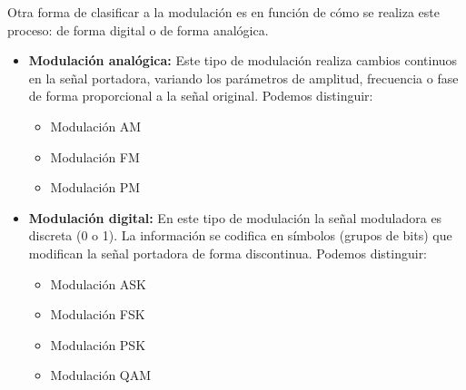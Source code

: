 \documentclass[12pt, letterpaper]{article}
\begin{document}
Otra forma de clasificar a la modulación es en función de cómo se realiza este proceso: de forma digital o de forma analógica. 

\begin{itemize}
    \item \textbf{Modulación analógica:} Este tipo de modulación realiza cambios continuos en la señal portadora, variando los parámetros de amplitud, frecuencia o fase de forma proporcional a la señal original. Podemos distinguir:
    \begin{itemize}
        \item Modulación AM
        \item Modulación FM
        \item Modulación PM
    \end{itemize}

    \item \textbf{Modulación digital:} En este tipo de modulación la señal moduladora es discreta (0 o 1). La información se codifica en símbolos (grupos de bits) que modifican la señal portadora de forma discontinua. Podemos distinguir:
    \begin{itemize}
        \item Modulación ASK
        \item Modulación FSK
        \item Modulación PSK
        \item Modulación QAM
    \end{itemize}
\end{itemize}
\end{document}
